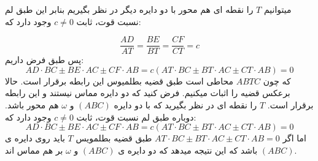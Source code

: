 \documentclass[10pt]{article}
\begin{document}
{میتوانیم $T$ را نقطه ای هم محور با دو دایره دیگر در نظر بگیریم بنابر این طبق لم نسبت قوت، ثابت $c\neq 0$ وجود دارد که:

\[ \frac{AD}{AT}=\frac{BE}{BT}=\frac {CF}{CT}=c \]
پس طبق فرض داریم:
\[
AD\cdot BC\pm BE\cdot AC \pm CF \cdot AB=c(AT\cdot BC\pm BT\cdot AC \pm CT\cdot AB)=0
\]
که چون $ABTC$ محاطی است طبق قضیه بطلمیوس این رابطه برقرار است. حالا برعکس قضیه را اثبات میکنیم. فرض کنید که دو دایره مماس نیستند و این رابطه برقرار است. $T$ را نقطه ای در نظر بگیرید که با دو دایره $(ABC)$ و $\omega$ هم محور باشد. دوباره طبق لم نسبت قوت، ثابت $c\neq 0$ وجود دارد که:
\[
AD\cdot BC\pm BE\cdot AC \pm CF \cdot AB=c(AT\cdot BC\pm BT\cdot AC \pm CT\cdot AB)=0
\]
اما اگر $AT\cdot BC\pm BT\cdot AC \pm CT\cdot AB=0$ طبق قضیه بطلمویس $T$ باید روی دایره ی $(ABC)$ باشد که این نتیجه میدهد که دو دایره ی $(ABC)$ و $\omega$ بر هم مماس اند.

}

\end{document}
